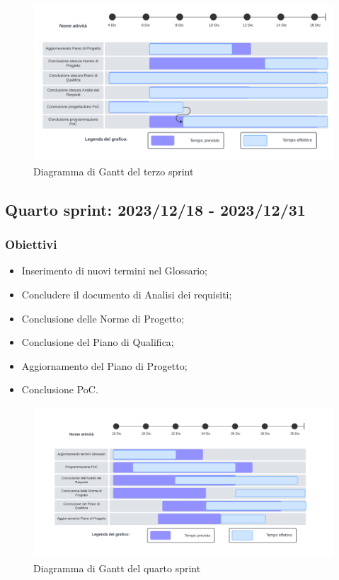 \begin{figure}[h!]
    \centering  
    \includegraphics[width=\textwidth]{Roadmap3sprint.png}
    \caption{Diagramma di Gantt del terzo sprint}
    \label{fig:roadmap3s}
\end{figure}
\newpage

\subsection{Quarto sprint: 2023/12/18 - 2023/12/31}
\subsubsection{Obiettivi}
\begin{itemize}[itemsep=-2pt]
    \item Inserimento di nuovi termini nel Glossario;
    \item Concludere il documento di Analisi dei requisiti;
    \item Conclusione delle Norme di Progetto;
    \item Conclusione del Piano di Qualifica;
    \item Aggiornamento del Piano di Progetto;
    \item Conclusione PoC.
\end{itemize}

\begin{figure}[h!]
    \centering  
    \includegraphics[width=\textwidth]{Roadmap4sprint.png}
    \caption{Diagramma di Gantt del quarto sprint}
    \label{fig:roadmap4s}
\end{figure}
\newpage

